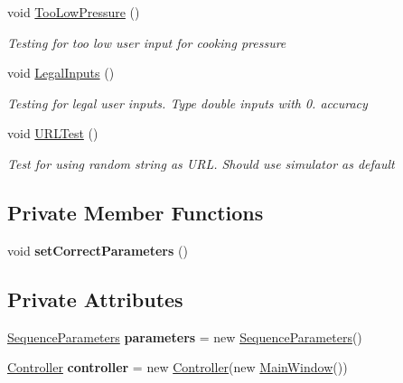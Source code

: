 \begin{DoxyCompactItemize}
void \hyperlink{class_controller_unit_test_1_1_unit_test1_a83cb8833e8eba5a8ca87257234602e6e}{Too\+Low\+Pressure} ()
\begin{DoxyCompactList}\small\item\em Testing for too low user input for cooking pressure \end{DoxyCompactList}\item 
void \hyperlink{class_controller_unit_test_1_1_unit_test1_a6b88d429df0c18261c8487cd785230b5}{Legal\+Inputs} ()
\begin{DoxyCompactList}\small\item\em Testing for legal user inputs. Type double inputs with 0. accuracy \end{DoxyCompactList}\item 
void \hyperlink{class_controller_unit_test_1_1_unit_test1_abc3e4821a5f8e5b0555298e835fec144}{U\+R\+L\+Test} ()
\begin{DoxyCompactList}\small\item\em Test for using random string as U\+RL. Should use simulator as default \end{DoxyCompactList}\end{DoxyCompactItemize}
\subsection*{Private Member Functions}
\begin{DoxyCompactItemize}
\item 
\mbox{\label{class_controller_unit_test_1_1_unit_test1_ad6e3fff5d7b13b7402d9bb3622b2b65e}} 
void {\bfseries set\+Correct\+Parameters} ()
\end{DoxyCompactItemize}
\subsection*{Private Attributes}
\begin{DoxyCompactItemize}
\item 
\mbox{\label{class_controller_unit_test_1_1_unit_test1_a5eb3618be40458ce225e23d432ff7861}} 
\hyperlink{class_a_s_e6030_1_1_sequence_parameters}{Sequence\+Parameters} {\bfseries parameters} = new \hyperlink{class_a_s_e6030_1_1_sequence_parameters}{Sequence\+Parameters}()
\item 
\mbox{\label{class_controller_unit_test_1_1_unit_test1_ac4e03bb6b6c9fbb959c2692995496039}} 
\hyperlink{class_a_s_e6030_1_1_controller}{Controller} {\bfseries controller} = new \hyperlink{class_a_s_e6030_1_1_controller}{Controller}(new \hyperlink{class_a_s_e6030_1_1_main_window}{Main\+Window}())
\end{DoxyCompactItemize}


